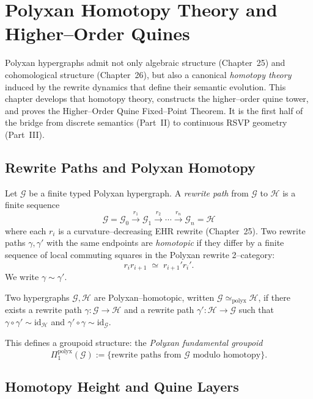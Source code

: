 \chapter{Polyxan Homotopy Theory and Higher--Order Quines}
\label{chap:27}

Polyxan hypergraphs admit not only algebraic structure (Chapter~25) and
cohomological structure (Chapter~26), but also a canonical
\emph{homotopy theory} induced by the rewrite dynamics that define their
semantic evolution.
This chapter develops that homotopy theory,
constructs the higher--order quine tower,
and proves the Higher--Order Quine Fixed--Point Theorem.
It is the first half of the bridge from discrete semantics (Part~II)
to continuous RSVP geometry (Part~III).

\section{Rewrite Paths and Polyxan Homotopy}

Let $\mathcal{G}$ be a finite typed Polyxan hypergraph.
A \emph{rewrite path} from $\mathcal{G}$ to $\mathcal{H}$ is a finite sequence
\[
\mathcal{G} = \mathcal{G}_0 \xrightarrow{r_1} \mathcal{G}_1
 \xrightarrow{r_2} \cdots \xrightarrow{r_n} \mathcal{G}_n = \mathcal{H}
\]
where each $r_i$ is a curvature--decreasing EHR rewrite (Chapter~25).
Two rewrite paths $\gamma, \gamma'$ with the same endpoints are
\emph{homotopic} if they differ by a finite sequence of
local commuting squares in the Polyxan rewrite 2--category:
\[
r_i r_{i+1} \;\simeq\; r_{i+1}' r_i'.
\]
We write $\gamma \sim \gamma'$.

\begin{definition}
Two hypergraphs $\mathcal{G},\mathcal{H}$ are Polyxan--homotopic,
written $\mathcal{G} \simeq_{\mathrm{polyx}} \mathcal{H}$,
if there exists a rewrite path $\gamma : \mathcal{G}\to\mathcal{H}$
and a rewrite path $\gamma' : \mathcal{H}\to\mathcal{G}$
such that $\gamma\circ\gamma' \sim \mathrm{id}_{\mathcal{H}}$
and $\gamma'\circ\gamma \sim \mathrm{id}_{\mathcal{G}}$.
\end{definition}

This defines a groupoid structure:
the \emph{Polyxan fundamental groupoid}
\[
\Pi_1^{\mathrm{polyx}}(\mathcal{G})
  := \{\text{rewrite paths from }\mathcal{G}\text{ modulo homotopy}\}.
\]

\section{Homotopy Height and Quine Layers}

